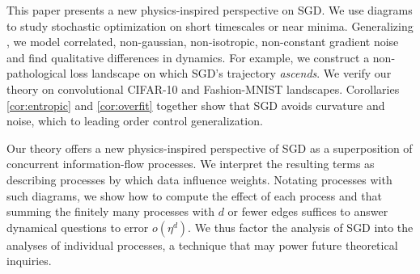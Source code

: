 


            This paper presents a new physics-inspired perspective on SGD.  We
            use diagrams to study stochastic optimization on short timescales
            or near minima. 
Generalizing \cite{li18,we19b,zh19,ba21}, we model correlated, non-gaussian,
non-isotropic, non-constant gradient noise and find qualitative differences in
dynamics.  For example, we construct a non-pathological loss landscape on which
SGD's trajectory \emph{ascends}.  We verify our theory on convolutional
CIFAR-10 and Fashion-MNIST landscapes.
            Corollaries \ref{cor:entropic} and
            \ref{cor:overfit} together show that SGD avoids curvature and
            noise, which to leading order control generalization.


Our theory offers a new physics-inspired perspective of SGD as a
superposition of concurrent information-flow processes.  
    We interpret the resulting terms as describing processes  
by which data influence
weights.  
Notating processes with such diagrams, we show
how to compute the effect of each process and that summing the finitely many
processes with $d$ or fewer edges suffices to answer dynamical questions to
error $o(\eta^d)$.  We thus factor the analysis of SGD into the analyses of
individual processes, a technique that may power future theoretical inquiries.  




